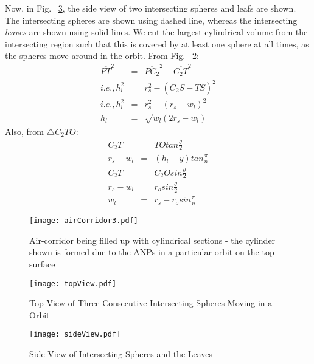 \documentclass[10pt]{IEEEtran}
\begin{document}
Now, in Fig.~ \ref{fig:side}, the side view of two intersecting spheres and leafs are shown. The intersecting spheres are shown using dashed line, whereas the intersecting {\em leaves} are shown using solid lines. We cut the largest cylindrical volume from the intersecting region such that this is covered by at least one sphere at all times, as the spheres move around in the orbit. From Fig.~ \ref{fig:top}:
\begin{eqnarray}
\label{eq:hlwl}
\overline{PT}^{2} & = & \overline{PC_{2}}^{2} - \overline{C_{2}T}^{2} \nonumber\\
i.e., h_{l}^{2} & = & r_{s}^{2} - (\overline{C_{2}S} - \overline{TS})^{2} \nonumber\\
i.e., h_{l}^{2} & = & r_{s}^{2} - (r_{s}-w_{l})^{2} \nonumber\\
h_{l} & = & \sqrt{w_{l}(2r_{s}-w_{l})}
\end{eqnarray}
Also, from $\triangle{C_{2}TO}$:
\begin{eqnarray}
\label{eq:rswl}
\overline{C_{2}T} & = & \overline{TO} tan\frac{\theta}{2} \nonumber\\
r_{s} - w_{l} & = & (h_{l}-y) tan\frac{\pi}{n}\\
\label{eq:rsro}
\overline{C_{2}T} & = & \overline{C_{2}O} sin\frac{\theta}{2} \nonumber \\
r_{s} - w_{l} & = & r_{o}sin\frac{\theta}{2} \nonumber \\
w_{l} & = & r_{s} - r_{o}sin\frac{\pi}{n} 
\end{eqnarray}

\begin{figure}[!t]
\centering
\texttt{[image: airCorridor3.pdf]}
\caption{Air-corridor being filled up with cylindrical sections - the cylinder shown is formed due to the ANPs in a particular orbit on the top surface}
\label{fig:airCorridor3}
\end{figure}
\begin{figure}[!t]
\centering
\texttt{[image: topView.pdf]}
\caption{Top View of Three Consecutive Intersecting Spheres Moving in a Orbit}
\label{fig:top}
\end{figure}
\begin{figure}[!t]
\centering
\texttt{[image: sideView.pdf]}
\caption{Side View of Intersecting Spheres and the Leaves}
\label{fig:side}
\end{figure}
\end{document}
